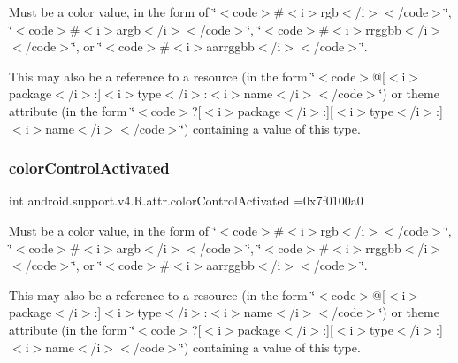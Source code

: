 Must be a color value, in the form of \char`\"{}$<$code$>$\#$<$i$>$rgb$<$/i$>$$<$/code$>$\char`\"{}, \char`\"{}$<$code$>$\#$<$i$>$argb$<$/i$>$$<$/code$>$\char`\"{}, \char`\"{}$<$code$>$\#$<$i$>$rrggbb$<$/i$>$$<$/code$>$\char`\"{}, or \char`\"{}$<$code$>$\#$<$i$>$aarrggbb$<$/i$>$$<$/code$>$\char`\"{}. 

This may also be a reference to a resource (in the form \char`\"{}$<$code$>$@\mbox{[}$<$i$>$package$<$/i$>$\+:\mbox{]}$<$i$>$type$<$/i$>$\+:$<$i$>$name$<$/i$>$$<$/code$>$\char`\"{}) or theme attribute (in the form \char`\"{}$<$code$>$?\mbox{[}$<$i$>$package$<$/i$>$\+:\mbox{]}\mbox{[}$<$i$>$type$<$/i$>$\+:\mbox{]}$<$i$>$name$<$/i$>$$<$/code$>$\char`\"{}) containing a value of this type. \mbox{\label{classandroid_1_1support_1_1v4_1_1R_1_1attr_a6189299faafd419a42d52ab33d2fbe35}} 
\subsubsection{\texorpdfstring{color\+Control\+Activated}{colorControlActivated}}
{\footnotesize\ttfamily int android.\+support.\+v4.\+R.\+attr.\+color\+Control\+Activated =0x7f0100a0\hspace{0.3cm}{\ttfamily [static]}}

Must be a color value, in the form of \char`\"{}$<$code$>$\#$<$i$>$rgb$<$/i$>$$<$/code$>$\char`\"{}, \char`\"{}$<$code$>$\#$<$i$>$argb$<$/i$>$$<$/code$>$\char`\"{}, \char`\"{}$<$code$>$\#$<$i$>$rrggbb$<$/i$>$$<$/code$>$\char`\"{}, or \char`\"{}$<$code$>$\#$<$i$>$aarrggbb$<$/i$>$$<$/code$>$\char`\"{}. 

This may also be a reference to a resource (in the form \char`\"{}$<$code$>$@\mbox{[}$<$i$>$package$<$/i$>$\+:\mbox{]}$<$i$>$type$<$/i$>$\+:$<$i$>$name$<$/i$>$$<$/code$>$\char`\"{}) or theme attribute (in the form \char`\"{}$<$code$>$?\mbox{[}$<$i$>$package$<$/i$>$\+:\mbox{]}\mbox{[}$<$i$>$type$<$/i$>$\+:\mbox{]}$<$i$>$name$<$/i$>$$<$/code$>$\char`\"{}) containing a value of this type. \mbox{\label{classandroid_1_1support_1_1v4_1_1R_1_1attr_ad8a8cfc0cf93dff590afe93fe48695cb}} 
